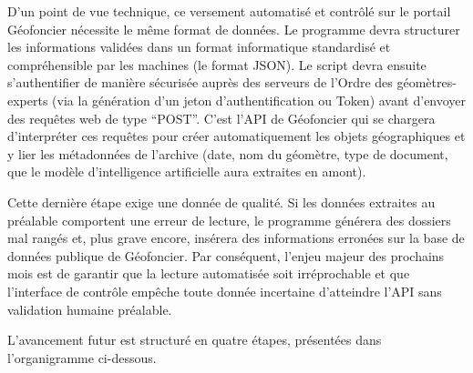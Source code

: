 \documentclass[a4paper,11pt]{article}
\begin{document}
D'un point de vue technique, ce versement automatisé et contrôlé sur le portail Géofoncier nécessite le même format de données. Le programme devra structurer les informations validées dans un format informatique standardisé et compréhensible par les machines (le format JSON). Le script devra ensuite s'authentifier de manière sécurisée auprès des serveurs de l'Ordre des géomètres-experts (via la génération d'un jeton d'authentification ou Token) avant d'envoyer des requêtes web de type \enquote{POST}. C'est l'API de Géofoncier qui se chargera d'interpréter ces requêtes pour créer automatiquement les objets géographiques et y lier les métadonnées de l'archive (date, nom du géomètre, type de document, que le modèle d'intelligence artificielle aura extraites en amont).

Cette dernière étape exige une donnée de qualité. Si les données extraites au préalable comportent une erreur de lecture, le programme générera des dossiers mal rangés et, plus grave encore, insérera des informations erronées sur la base de données publique de Géofoncier. Par conséquent, l'enjeu majeur des prochains mois est de garantir que la lecture automatisée soit irréprochable et que l'interface de contrôle empêche toute donnée incertaine d'atteindre l'API sans validation humaine préalable.

L'avancement futur est structuré en quatre étapes, présentées dans l'organigramme ci-dessous.
\end{document}

